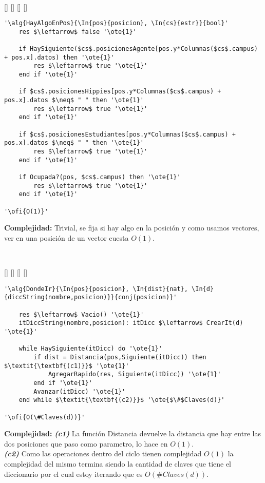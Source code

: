 ~

[]
{}
[]
[]
[]

\begin{lstlisting}[mathescape]
'\alg{HayAlgoEnPos}{\In{pos}{posicion}, \In{cs}{estr}}{bool}'
	res $\leftarrow$ false '\ote{1}'

	if HaySiguiente($cs$.posicionesAgente[pos.y*Columnas($cs$.campus) + pos.x].datos) then '\ote{1}'
		res $\leftarrow$ true '\ote{1}'
	end if '\ote{1}'

	if $cs$.posicionesHippies[pos.y*Columnas($cs$.campus) + pos.x].datos $\neq$ " " then '\ote{1}'
		res $\leftarrow$ true '\ote{1}'
	end if '\ote{1}'

	if $cs$.posicionesEstudiantes[pos.y*Columnas($cs$.campus) + pos.x].datos $\neq$ " " then '\ote{1}'
		res $\leftarrow$ true '\ote{1}'
	end if '\ote{1}'

	if Ocupada?(pos, $cs$.campus) then '\ote{1}'
		res $\leftarrow$ true '\ote{1}'
	end if '\ote{1}'

'\ofi{O(1)}'
\end{lstlisting}

\textbf{Complejidad:} Trivial, se fija si hay algo en la posición y como usamos vectores, ver en una posición de un vector cuesta $O(1)$.

~

[]
{}
[]
[]
[]

\begin{lstlisting}[mathescape]
'\alg{DondeIr}{\In{pos}{posicion}, \In{dist}{nat}, \In{d}{diccString(nombre,posicion)}}{conj(posicion)}'

	res $\leftarrow$ Vacio() '\ote{1}'
	itDiccString(nombre,posicion): itDicc $\leftarrow$ CrearIt(d) '\ote{1}'

	while HaySiguiente(itDicc) do '\ote{1}'
		if dist = Distancia(pos,Siguiente(itDicc)) then $\textit{\textbf{(c1)}}$ '\ote{1}'
			AgregarRapido(res, Siguiente(itDicc)) '\ote{1}'
		end if '\ote{1}'
		Avanzar(itDicc) '\ote{1}'
	end while $\textit{\textbf{(c2)}}$ '\ote{$\#$Claves(d)}'

'\ofi{O(\#Claves(d))}'
\end{lstlisting}

\textbf{Complejidad:} \textit{\textbf{(c1)}} La función Distancia devuelve la distancia que hay entre las dos posiciones que paso como parametro, lo hace en $O(1)$. \\
\textit{\textbf{(c2)}} Como las operaciones dentro del ciclo tienen complejidad $O(1)$ la complejidad del mismo termina siendo la cantidad de claves que tiene el diccionario por el cual estoy iterando que es $O(\#Claves(d))$.

